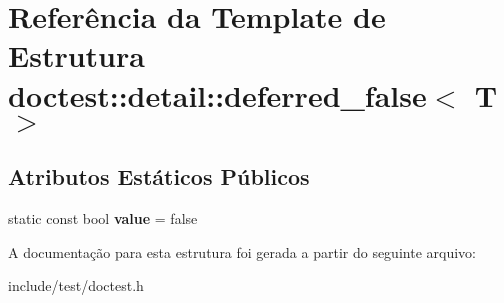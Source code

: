 \hypertarget{structdoctest_1_1detail_1_1deferred__false}{}\section{Referência da Template de Estrutura doctest\+:\+:detail\+:\+:deferred\+\_\+false$<$ T $>$}
\label{structdoctest_1_1detail_1_1deferred__false}
\subsection*{Atributos Estáticos Públicos}
\begin{DoxyCompactItemize}
\item 
\mbox{\label{structdoctest_1_1detail_1_1deferred__false_abc8eec7a8439ab592f76068cb408d106}} 
static const bool {\bfseries value} = false
\end{DoxyCompactItemize}


A documentação para esta estrutura foi gerada a partir do seguinte arquivo\+:\begin{DoxyCompactItemize}
\item 
include/test/doctest.\+h\end{DoxyCompactItemize}

